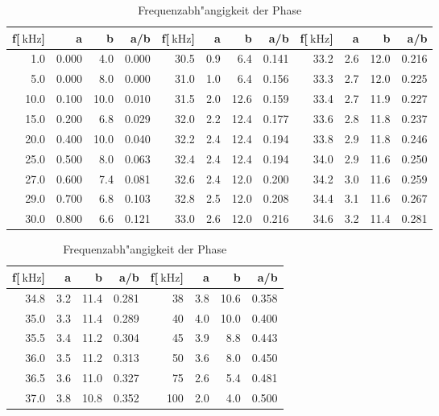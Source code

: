 \begin{table}[!h]
\begin{center}
\begin{tabular}{|r|r|r|r|r|r|r|r|r|r|r|r|}
\hline
f[$\SI{}{\kilo\hertz}$] & a & b & a/b & f[$\SI{}{\kilo\hertz}$] & a & b & a/b & f[$\SI{}{\kilo\hertz}$] & a & b & a/b\\
\hline
\hline
1.0  & 0.000 & 4.0  & 0.000 & 30.5 & 0.9 & 6.4  & 0.141 & 33.2 & 2.6 & 12.0 & 0.216\\
5.0  & 0.000 & 8.0  & 0.000 & 31.0 & 1.0 & 6.4  & 0.156 & 33.3 & 2.7 & 12.0 & 0.225\\
10.0 & 0.100 & 10.0 & 0.010 & 31.5 & 2.0 & 12.6 & 0.159 & 33.4 & 2.7 & 11.9 & 0.227\\
15.0 & 0.200 & 6.8  & 0.029 & 32.0 & 2.2 & 12.4 & 0.177 & 33.6 & 2.8 & 11.8 & 0.237\\
20.0 & 0.400 & 10.0 & 0.040 & 32.2 & 2.4 & 12.4 & 0.194 & 33.8 & 2.9 & 11.8 & 0.246\\
25.0 & 0.500 & 8.0  & 0.063 & 32.4 & 2.4 & 12.4 & 0.194 & 34.0 & 2.9 & 11.6 & 0.250\\
27.0 & 0.600 & 7.4  & 0.081 & 32.6 & 2.4 & 12.0 & 0.200 & 34.2 & 3.0 & 11.6 & 0.259\\
29.0 & 0.700 & 6.8  & 0.103 & 32.8 & 2.5 & 12.0 & 0.208 & 34.4 & 3.1 & 11.6 & 0.267\\
30.0 & 0.800 & 6.6  & 0.121 & 33.0 & 2.6 & 12.0 & 0.216 & 34.6 & 3.2 & 11.4 & 0.281\\
\hline
\end{tabular}
\end{center}
\begin{center}
\begin{tabular}{|r|r|r|r|r|r|r|r|}
\hline
f[$\SI{}{\kilo\hertz}$] & a & b & a/b & f[$\SI{}{\kilo\hertz}$] & a & b & a/b \\
\hline
\hline
34.8 & 3.2 & 11.4 & 0.281 & 38  & 3.8 & 10.6 & 0.358 \\
35.0 & 3.3 & 11.4 & 0.289 & 40  & 4.0 & 10.0 & 0.400 \\
35.5 & 3.4 & 11.2 & 0.304 & 45  & 3.9 & 8.8  & 0.443 \\
36.0 & 3.5 & 11.2 & 0.313 & 50  & 3.6 & 8.0  & 0.450 \\
36.5 & 3.6 & 11.0 & 0.327 & 75  & 2.6 & 5.4  & 0.481 \\
37.0 & 3.8 & 10.8 & 0.352 & 100 & 2.0 & 4.0  & 0.500 \\
\hline
\end{tabular}
\caption[Messwerte zu Aufgabenteil d]{Frequenzabh"angigkeit der Phase}
\label{phase}
\end{center}
\end{table}
